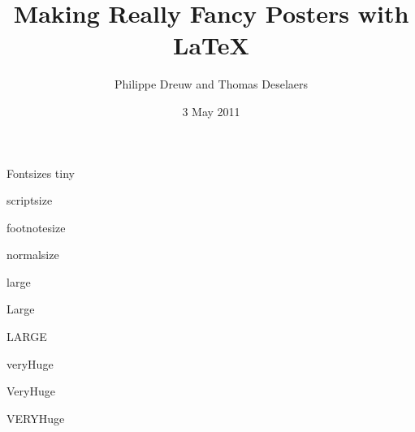 \documentclass[final]{beamer} %
\title[Fancy Posters]{Making Really Fancy Posters with \LaTeX}
\author[Dreuw \& Deselaers]{Philippe Dreuw and Thomas Deselaers}
\institute[RWTH Aachen University]{Human Language Technology and Pattern Recognition,RWTH Aachen University}
\date{3 May 2011}
\begin{document}
  \begin{frame}{} 
    \vfill
    \begin{block}{\large Fontsizes}
      \centering
      {\tiny tiny}\par
      {\scriptsize scriptsize}\par
      {\footnotesize footnotesize}\par
      {\normalsize normalsize}\par
      {\large large}\par
      {\Large Large}\par
      {\LARGE LARGE}\par
      {\veryHuge veryHuge}\par
      {\VeryHuge VeryHuge}\par
      {\VERYHuge VERYHuge}\par
    \end{block}
    \vfill
  \end{frame}
  
\end{document}
